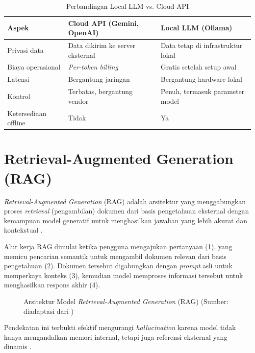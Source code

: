 \begin{table}[H]
\centering
\caption{Perbandingan Local LLM vs. Cloud API}
\label{tab:local_vs_cloud}
\begin{tabularx}{\textwidth}{lXX}
\toprule
\textbf{Aspek} & \textbf{Cloud API (Gemini, OpenAI)} & \textbf{Local LLM (Ollama)} \\
\midrule
Privasi data & Data dikirim ke server eksternal & Data tetap di infrastruktur lokal \\
Biaya operasional & \textit{Per-token billing} & Gratis setelah setup awal \\
Latensi & Bergantung jaringan & Bergantung hardware lokal \\
Kontrol & Terbatas, bergantung vendor & Penuh, termasuk parameter model \\
Ketersediaan offline & Tidak & Ya \\
\bottomrule
\end{tabularx}
\end{table}

\section{Retrieval-Augmented Generation (RAG)}
\textit{Retrieval-Augmented Generation} (RAG) adalah arsitektur yang menggabungkan
proses \textit{retrieval} (pengambilan) dokumen dari basis pengetahuan eksternal dengan
kemampuan model generatif untuk menghasilkan jawaban yang lebih akurat dan
kontekstual \cite{Lewis2020}.

Alur kerja RAG dimulai ketika pengguna mengajukan pertanyaan (1), yang memicu
pencarian semantik untuk mengambil dokumen relevan dari basis pengetahuan (2).
Dokumen tersebut digabungkan dengan \textit{prompt} asli untuk memperkaya konteks (3),
kemudian model memproses informasi tersebut untuk menghasilkan respons akhir (4).

\begin{figure}[H]
  \centering
  \caption{Arsitektur Model \textit{Retrieval-Augmented Generation} (RAG) (Sumber: diadaptasi dari \cite{Lewis2020})}
  \label{fig:rag}
\end{figure}

Pendekatan ini terbukti efektif mengurangi \textit{hallucination} karena model tidak
hanya mengandalkan memori internal, tetapi juga referensi eksternal yang dinamis \cite{Lewis2020}.

